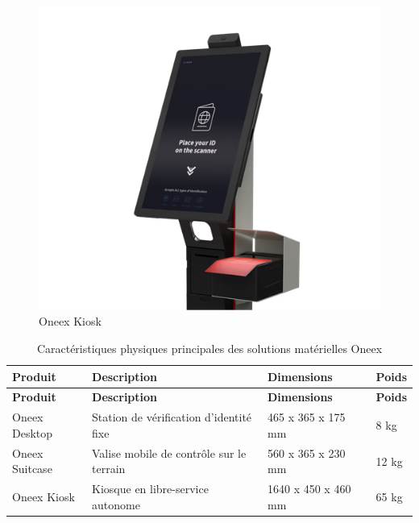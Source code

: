 \begin{itemize}
	      \begin{figure} [H]
		      \centering
		      \includegraphics[width=.5\textwidth]{figures/Oneex kiosk.png}
		      \caption{Oneex Kiosk}
	      \end{figure}
\end{itemize}

\begin{longtable}{|p{3cm}|p{5cm}|p{4cm}|p{2.5cm}|}
	\caption{Caractéristiques physiques principales des solutions matérielles Oneex}
	\label{tab:caracteristiques-produits}                                                                  \\
	\hline
	\textbf{Produit}                         & \textbf{Description} & \textbf{Dimensions} & \textbf{Poids} \\ \hline
	\endfirsthead
	\hline
	\textbf{Produit}                         & \textbf{Description} & \textbf{Dimensions} & \textbf{Poids} \\ \hline
	\endhead
	\hline
	\endfoot
	Oneex Desktop                            &
	Station de vérification d’identité fixe  &
	465 x 365 x 175 mm                       &
	8 kg                                                                                                   \\ \hline
	Oneex Suitcase                           &
	Valise mobile de contrôle sur le terrain &
	560 x 365 x 230 mm                       &
	12 kg                                                                                                  \\ \hline
	Oneex Kiosk                              &
	Kiosque en libre-service autonome        &
	1640 x 450 x 460 mm                      &
	65 kg                                                                                                  \\ \hline

\end{longtable}

